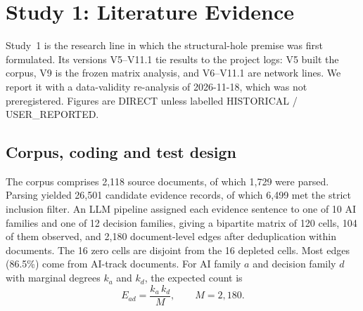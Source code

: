 
\section{Study 1: Literature Evidence}
\label{sec:study1}

Study~1 is the research line in which the structural-hole premise was first formulated. Its versions V5--V11.1 tie results to the project logs: V5 built the corpus, V9 is the frozen matrix analysis, and V6--V11.1 are network lines. We report it with a data-validity re-analysis of 2026-11-18, which was not preregistered. Figures are DIRECT unless labelled HISTORICAL / USER\_REPORTED.

\subsection{Corpus, coding and test design}
\label{sec:study1_corpus}

The corpus comprises 2,118 source documents, of which 1,729 were parsed. Parsing yielded 26,501 candidate evidence records, of which 6,499 met the strict inclusion filter. An LLM pipeline assigned each evidence sentence to one of 10 AI families and one of 12 decision families, giving a bipartite matrix of 120 cells, 104 of them observed, and 2,180 document-level edges after deduplication within documents. The 16 zero cells are disjoint from the 16 depleted cells. Most edges (86.5\%) come from AI-track documents. For AI family $a$ and decision family $d$ with marginal degrees $k_a$ and $k_d$, the expected count is
\begin{equation}
E_{ad} = \frac{k_a\,k_d}{M}, \qquad M = 2{,}180 .
\label{eq:s1_expected}
\end{equation}

